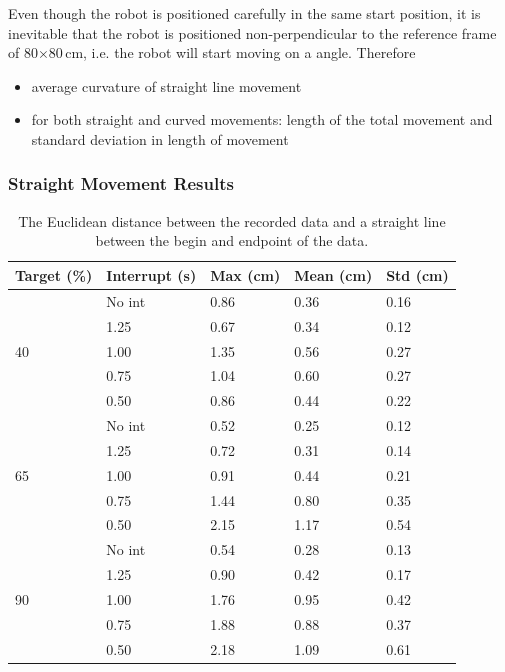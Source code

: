 Even though the robot is positioned carefully in the same start position, it is inevitable that the robot is positioned non-perpendicular to the reference frame of 80$\times$80\,cm, i.e. the robot will start moving on a angle.
Therefore 

\begin{itemize}
	\item average curvature of straight line movement

	\item for both straight and curved movements: length of the total movement and standard deviation in length of movement
\end{itemize}


\subsubsection{Straight Movement Results}

\begin{table}[t]
	\centering
	\caption{The Euclidean distance between the recorded data and a straight line between the begin and endpoint of the data.}
	\label{tab:straight_results}
	\begin{tabular}{|l|l||l|l|l|}
		\hline
		Target (\%) & Interrupt (s) & Max (cm) & Mean (cm) & Std (cm)\\
		\hline \hline
		\multirow{5}{*}{40} & No int & 0.86 & 0.36 & 0.16 \\
		& 1.25 & 0.67 & 0.34 & 0.12 \\
		& 1.00 & 1.35 & 0.56 & 0.27 \\
		& 0.75 & 1.04 & 0.60 & 0.27 \\
		& 0.50 & 0.86 & 0.44 & 0.22 \\
		\hline
		\multirow{5}{*}{65} & No int & 0.52 & 0.25 & 0.12 \\
		& 1.25 & 0.72 & 0.31 & 0.14 \\
		& 1.00 & 0.91 & 0.44 & 0.21 \\
		& 0.75 & 1.44 & 0.80 & 0.35 \\
		& 0.50 & 2.15 & 1.17 & 0.54 \\
		\hline
		\multirow{5}{*}{90} & No int & 0.54 & 0.28 & 0.13 \\
		& 1.25 & 0.90 & 0.42 & 0.17 \\
		& 1.00 & 1.76 & 0.95 & 0.42 \\
		& 0.75 & 1.88 & 0.88 & 0.37 \\
		& 0.50 & 2.18 & 1.09 & 0.61 \\
		\hline
	\end{tabular}
\end{table}

